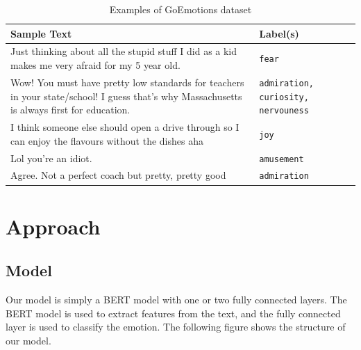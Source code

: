 \documentclass{article}
\begin{document}
\begin{table}[H]
  \centering
  \renewcommand\arraystretch{1.5}
  \begin{tabular}{p{}p{}}
    \hline
    \textbf{Sample Text}                                                                                                                       & \textbf{Label(s)}                          \\
    \hline
    \hline
    Just thinking about all the stupid stuff I did  as a kid makes me very afraid for my 5 year old.                                           & \texttt{fear}                              \\
    \hline
    Wow! You must have pretty low standards for teachers in your state/school! I guess that's why Massachusetts is always first for education. & \texttt{admiration, curiosity, nervouness} \\
    \hline
    I think someone else should open a drive through so I can enjoy the flavours without the dishes aha                                        & \texttt{joy}                               \\
    \hline
    Lol you're an idiot.                                                                                                                       & \texttt{amusement}                         \\
    \hline
    Agree. Not a perfect coach but pretty, pretty good                                                                                         & \texttt{admiration}                        \\
    \hline
  \end{tabular}
  \vspace{0.2cm}
  \caption{Examples of GoEmotions dataset}
\end{table}

\section{Approach}

\subsection{Model}

Our model is simply a BERT model with one or two fully connected layers. The BERT model is used to extract features from the text, and the fully connected layer is used to classify the emotion. The following figure shows the structure of our model.
\end{document}
